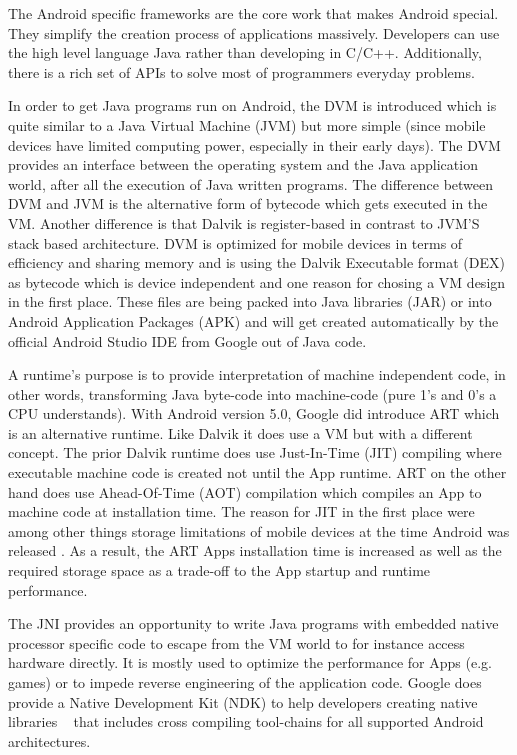The Android specific frameworks are the core work that makes Android
special. They simplify the creation process of applications massively.
Developers can use the high level language Java rather than developing
in C/C++. Additionally, there is a rich set of APIs to solve most of
programmers everyday problems.

In order to get Java programs run on Android, the DVM is introduced
which is quite similar to a Java Virtual Machine (JVM) but more simple (since
mobile devices have limited computing power, especially in their early days).
The DVM provides an interface between the operating system and
the Java application world, after all the execution of Java written programs.
The difference between DVM and JVM is the alternative form of bytecode
which gets executed in the VM. Another difference is that Dalvik is
register-based in contrast to JVM'S stack based architecture.
DVM is optimized for mobile devices
in terms of efficiency and sharing memory and is using the
Dalvik Executable format (DEX) as bytecode which is device
independent and one reason for chosing a VM design in the first place\parencite[p.11f]{levin}. These  files are being
packed into Java libraries (JAR) or into Android Application Packages (APK)
and will get created automatically by the official Android Studio IDE from Google out of Java code.

A runtime's purpose is to provide
interpretation of machine independent code, in other words,
transforming Java byte-code into machine-code (pure 1's and 0's a CPU understands).
With Android version 5.0, Google did introduce ART which is an
alternative runtime. Like Dalvik it does use a VM but with a
different concept.
The prior Dalvik runtime does use Just-In-Time (JIT) compiling
where executable machine code is created not until the App runtime.
ART on the other hand does use Ahead-Of-Time (AOT) compilation
which compiles an App to machine code at installation time.
The reason for JIT in the first place were among other things
storage limitations of mobile devices at the time Android was released
\parencite[p.11f]{levin}. As a result, the ART Apps installation time
is increased as well as the required storage space as a trade-off
to the App startup and runtime performance.

The JNI provides an opportunity to write Java programs with embedded
native processor specific code to escape from the VM world to for
instance access hardware directly.
It is mostly used to optimize the performance for Apps (e.g. games)
or to impede reverse engineering of the application code.
Google does provide a Native Development Kit (NDK) to help
developers creating native libraries ~\parencite{ndk} that includes
cross compiling tool-chains for all supported Android architectures.


